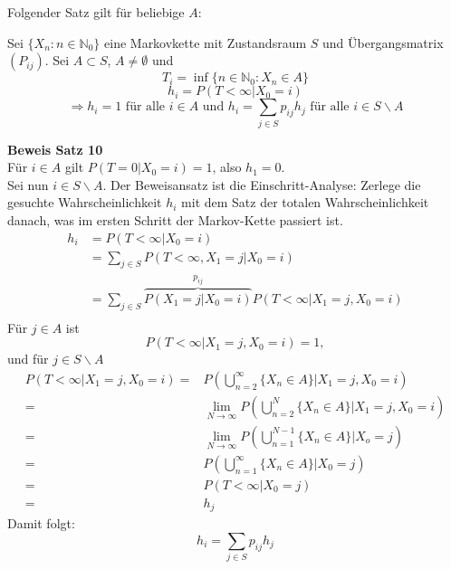 \documentclass[a4paper,12pt]{article}
\begin{document}
Folgender Satz gilt für beliebige $A$:\\

\begin{tcolorbox}[breakable, colframe=green, colback=white, title=Satz 10]
Sei $\{X_n: n \in \mathbb{N}_0\}$ eine Markovkette mit Zustandsraum $S$ und Übergangsmatrix $(P_{ij})$. 
Sei $A \subset S$, $A \neq \emptyset$ und
$$
T_i = \inf \{n \in \mathbb{N}_0: X_n \in A\}
$$
$$
h_i = P(T < \infty | X_0 = i)
$$
$$
\Rightarrow h_i = 1 \text{ für alle } i \in A \text{ und } 
h_i = \sum_{j \in S}p_{ij}h_j \text{ für alle } i \in S \backslash A
$$
\end{tcolorbox}

\textbf{Beweis Satz 10}\\
Für $i \in A$ gilt $P(T=0|X_0 = i) = 1$, also $h_1 = 0$.\\
Sei nun $i \in S \backslash A$. Der Beweisansatz ist die Einschritt-Analyse:
Zerlege die gesuchte Wahrscheinlichkeit $h_i$ mit dem Satz der totalen Wahrscheinlichkeit danach, was im ersten Schritt der Markov-Kette passiert ist.
\begin{align*}
	h_i & = P(T<\infty|X_0 = i) \\
	&= \sum_{j \in S} P(T < \infty, X_1 = j | X_0 = i) \\
	& = \sum_{j \in S} \overbrace{P(X_1 = j|X_0 = i)}^{p_{ij}}P(T < \infty | X_1 = j, X_0 = i)\\
\end{align*} 
Für $j \in A$ ist
$$
P(T<\infty|X_1 = j, X_0 = i) = 1,
$$
und für $j \in S \backslash A$
\begin{align*}
P(T< \infty | X_1 = j, X_0 = i) =& P\left(\bigcup_{n=2}^\infty \{X_n \in A\}| X_1 = j, X_0 = i\right)\\
=& \lim_{N \to \infty} P\left(\bigcup_{n=2}^N \{X_n \in A\}| X_1 = j, X_0 = i\right)\\
=&  \lim_{N \to \infty} P \left(\bigcup_{n=1}^{N-1} \{X_n \in A\}| X_o = j\right) \\
=&  P\left(\bigcup_{n=1}^\infty \{X_n \in A\}| X_0 = j\right) \\
=&  P(T < \infty | X_0 = j) \\
=&  h_j
\end{align*}
Damit folgt: $$h_i = \sum_{j \in S}p_{ij}h_j$$
\end{document}
